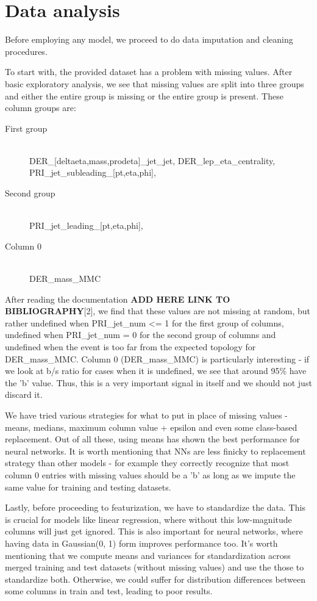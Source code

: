 \documentclass[10pt,conference,compsocconf]{IEEEtran}
\begin{document}
\section{Data analysis}
Before employing any model, we proceed to do data imputation and cleaning procedures.

To start with, the provided dataset has a problem with missing values. After basic exploratory analysis, we see that missing values are split into three groups and either the entire group is missing or the entire group is present. These column groups are:
\begin{description}
	\item[First group] \ \\
	DER\_[deltaeta,mass,prodeta]\_jet\_jet, DER\_lep\_eta\_centrality, PRI\_jet\_subleading\_[pt,eta,phi],
	\item[Second group] \ \\
	PRI\_jet\_leading\_[pt,eta,phi],
	\item[Column 0] \ \\
	DER\_mass\_MMC
\end{description}
After reading the documentation \textbf{ADD HERE LINK TO BIBLIOGRAPHY}[2], we find that these values are not missing at random, but rather undefined when PRI\_jet\_num <= 1 for the first group of columns, undefined when PRI\_jet\_num = 0 for the second group of columns and undefined when the event is too far from the expected topology for DER\_mass\_MMC. Column 0 (DER\_mass\_MMC) is particularly interesting - if we look at b/s ratio for cases when it is undefined, we see that around 95\% have the 'b' value. Thus, this is a very important signal in itself and we should not just discard it.
  
We have tried various strategies for what to put in place of missing values - means, medians, maximum column value + epsilon and even some class-based replacement. Out of all these, using means has shown the best performance for neural networks. It is worth mentioning that NNs are less finicky to replacement strategy than other models - for example they correctly recognize that most column 0 entries with missing values should be a 'b' as long as we impute the same value for training and testing datasets.

Lastly, before proceeding to featurization, we have to standardize the data. This is crucial for models like linear regression, where without this low-magnitude columns will just get ignored. This is also important for neural networks, where having data in Gaussian(0, 1) form improves performance too. It's worth mentioning that we compute means and variances for standardization across merged training and test datasets (without missing values) and use the those to standardize both. Otherwise, we could suffer for distribution differences between some columns in train and test, leading to poor results.
\end{document}
